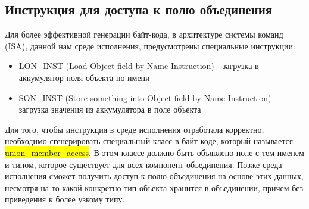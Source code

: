 \subsection{Инструкция для доступа к полю объединения}

Для более эффективной генерации байт-кода, в архитектуре системы команд (ISA), данной нам среде исполнения, предусмотрены
специальные инструкции:

\begin{itemize}[left=2em]
    \item LON\_INST (Load Object field by Name Instruction) - загрузка в аккумулятор поля объекта по имени
    \item SON\_INST (Store something into Object field by Name Instruction) - загрузка значения
    из аккумулятора в поле объекта
\end{itemize}

Для того, чтобы инструкция в среде исполнения отработала корректно, необходимо сгенерировать специальный класс в
байт-коде, который называется \hl{union\_member\_access}.
В этом классе должно быть объявлено поле с тем именем и типом, которое существует для всех компонент объединения.
Позже среда исполнения сможет получить доступ к полю объединения на основе этих данных, несмотря на то
какой конкретно тип объекта хранится в объединении, причем без приведения к более узкому типу.

\newpage
